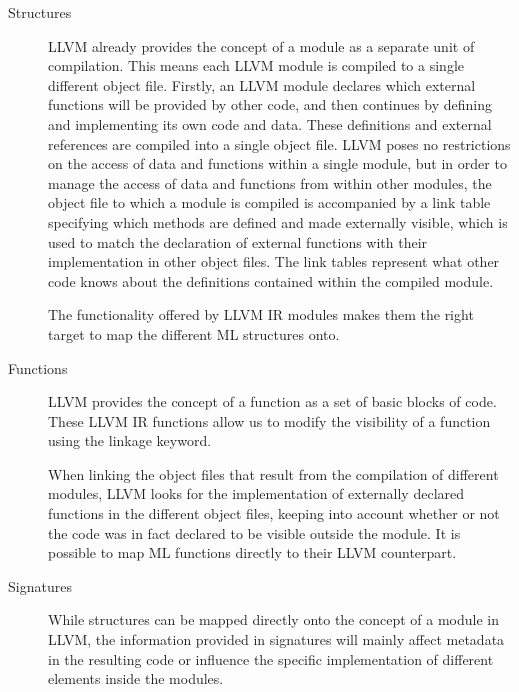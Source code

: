 \documentclass[10pt,a4paper]{report}
\begin{document}
\begin{description}
\item[Structures]
LLVM already provides the concept of a module as a separate unit of compilation. This means each LLVM module is compiled to a single different object file. Firstly, an LLVM module declares which external functions will be provided by other code, and then continues by defining and implementing its own code and data. These definitions and external references are compiled into a single object file. LLVM poses no restrictions on the access of data and functions within a single module, but in order to manage the access of data and functions from within other modules, the object file to which a module is compiled is accompanied by a link table specifying which methods are defined and made externally visible, which is used to match the declaration of external functions with their implementation in other object files. The link tables represent what other code knows about the definitions contained within the compiled module.



The functionality offered by LLVM IR modules makes them the right target  to map the different ML structures onto.

\item[Functions]
LLVM provides the concept of a function as a set of basic blocks of code. 
These LLVM IR functions allow us to modify the visibility of a function using the linkage keyword. 

When linking the object files that result from the compilation of different modules, LLVM looks for the implementation of externally declared functions in the different object files, keeping into account whether or not the code was in fact declared to be visible outside the module. It is possible to map ML functions directly to their LLVM counterpart.

\item[Signatures]
While structures can be mapped directly onto the concept of a module in LLVM, the information provided in signatures will mainly affect metadata in the resulting code or influence the specific implementation of different elements inside the modules.


\end{description}
\end{document}
